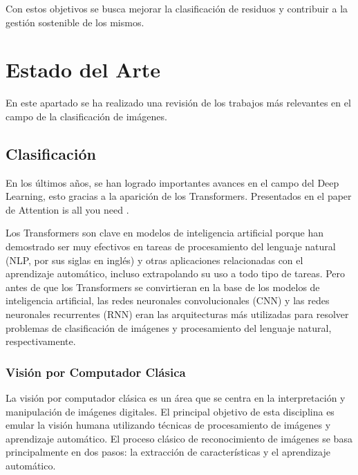 \documentclass[10pt,a4paper,twocolumn,twoside]{article}
\begin{document}
Con estos objetivos se busca mejorar la clasificación de residuos y contribuir a la gestión sostenible de los mismos.

\section{Estado del Arte}

En este apartado se ha realizado una revisión de los trabajos más relevantes en el campo de la clasificación de imágenes.

\subsection{Clasificación}

En los últimos años, se han logrado importantes avances en el campo del Deep Learning, esto gracias a la aparición
de los Transformers. Presentados en el paper de Attention is all you need \cite{transformers}.

Los Transformers son clave en modelos de inteligencia artificial porque han demostrado ser muy efectivos en tareas
de procesamiento del lenguaje natural (NLP, por sus siglas en inglés) y otras aplicaciones relacionadas con el
aprendizaje automático, incluso extrapolando su uso a todo tipo de tareas. Pero antes de que los Transformers
se convirtieran en la base de los modelos de inteligencia artificial, las redes neuronales convolucionales (CNN) y
las redes neuronales recurrentes (RNN) eran las arquitecturas más utilizadas para resolver problemas de clasificación
de imágenes y procesamiento del lenguaje natural, respectivamente.

\subsubsection{Visión por Computador Clásica}

La visión por computador clásica es un área que se centra en la interpretación y manipulación de imágenes digitales. El principal objetivo de esta disciplina es emular la visión humana utilizando técnicas de procesamiento de imágenes y aprendizaje automático. El proceso clásico de reconocimiento de imágenes se basa principalmente en dos pasos: la extracción de características y el aprendizaje automático.
\end{document}
